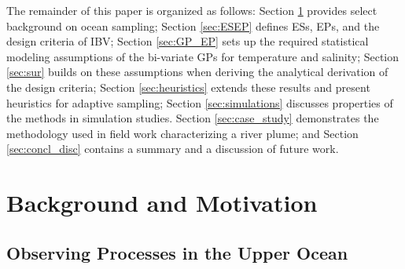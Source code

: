 \documentclass[aoas]{imsart}
\begin{document}
The remainder of this paper is organized as follows: Section
\ref{sec:bg} provides select background on ocean sampling; Section
\ref{sec:ESEP} defines ESs, EPs, and the design criteria of IBV;
Section \ref{sec:GP_EP} sets up the required statistical modeling
assumptions of the bi-variate GPs for temperature and salinity;
Section \ref{sec:sur} builds on these assumptions when deriving the
analytical derivation of the design criteria; Section
\ref{sec:heuristics} extends these results and present heuristics for
adaptive sampling; Section \ref{sec:simulations}
discusses properties of the methods in simulation studies. Section
\ref{sec:case_study} demonstrates the methodology used in field work
characterizing a river plume; and Section \ref{sec:concl_disc}
contains a summary and a discussion of future work.


\section{Background and Motivation}\label{sec:bg}


\subsection{Observing Processes in the Upper Ocean}


\end{document}
